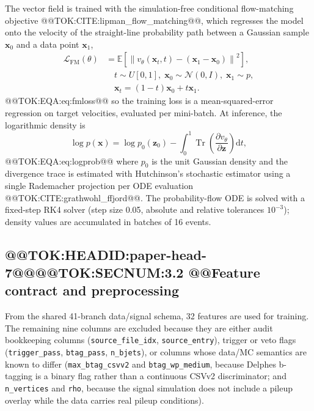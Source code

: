 \documentclass[11pt]{article}
\begin{document}
The vector field is trained with the simulation-free conditional
flow-matching objective @@TOK:CITE:lipman_flow_matching@@, which regresses the
model onto the velocity of the straight-line probability path between a
Gaussian sample $\mathbf{x}_0$ and a data point $\mathbf{x}_1$,
\begin{equation}
  \begin{split}
  \mathcal{L}_{\mathrm{FM}}(\theta)
  &= \mathbb{E}\!\left[
  \left\lVert
  v_\theta(\mathbf{x}_t,t)-(\mathbf{x}_1-\mathbf{x}_0)
  \right\rVert^2
  \right],\\
  &\quad
  t\sim U[0,1],\;
  \mathbf{x}_0\sim\mathcal{N}(0,I),\;
  \mathbf{x}_1\sim p,\\
  &\quad
  \mathbf{x}_t=(1-t)\mathbf{x}_0+t\mathbf{x}_1.
  \end{split}
  
\end{equation}@@TOK:EQA:eq:fmloss@@
so the training loss is a mean-squared-error regression on target
velocities, evaluated per mini-batch. At inference, the logarithmic density
is
\begin{equation}
  \log p(\mathbf{x}) = \log p_0(\mathbf{z}_0) - \int_0^1 \operatorname{Tr}\!\left( \frac{\partial v_\theta}{\partial \mathbf{z}} \right) \mathrm{d}t,
  
\end{equation}@@TOK:EQA:eq:logprob@@
where $p_0$ is the unit Gaussian density and the divergence trace is
estimated with Hutchinson's stochastic estimator using a single Rademacher
projection per ODE evaluation @@TOK:CITE:grathwohl_ffjord@@. The probability-flow
ODE is solved with a fixed-step RK4 solver (step size 0.05, absolute and
relative tolerances $10^{-3}$); density values are accumulated in batches of
16 events.

\subsection{@@TOK:HEADID:paper-head-7@@@@TOK:SECNUM:3.2 @@Feature contract and preprocessing}

From the shared 41-branch data/signal schema, 32 features are used for
training. The remaining nine columns are excluded because they are either
audit bookkeeping columns (\texttt{source\_file\_idx}, \texttt{source\_entry}),
trigger or veto flags (\texttt{trigger\_pass}, \texttt{btag\_pass},
\texttt{n\_bjets}), or columns whose data/MC semantics are known to differ
(\texttt{max\_btag\_csvv2} and \texttt{btag\_wp\_medium}, because Delphes
b-tagging is a binary flag rather than a continuous CSVv2 discriminator; and
\texttt{n\_vertices} and \texttt{rho}, because the signal simulation does not
include a pileup overlay while the data carries real pileup conditions).
\end{document}
